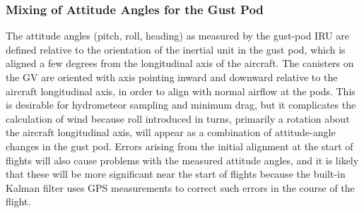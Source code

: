 \documentclass[12pt,twoside,english]{article}\usepackage[]{graphicx}\usepackage[]{color}
\let\OrgIndex\index
\renewcommand*{\index}[1]{\OrgIndex{#1}}
\begin{document}
\subsubsection{Mixing of Attitude Angles for the Gust Pod}



The attitude angles (pitch, roll,  heading) as measured by the gust-pod IRU are defined relative to the orientation of the inertial unit in the gust pod, which is aligned a few degrees from the longitudinal axis of the aircraft. The canisters on the GV are oriented with axis pointing inward and downward relative to the aircraft longitudinal axis, in order to align with normal airflow at the pods. This is desirable for hydrometeor sampling and minimum drag, but it complicates the calculation of wind because roll introduced in turns, primarily a rotation about the aircraft longitudinal axis, will appear as a combination of attitude-angle changes in the gust pod. Errors arising from the initial alignment at the start of flights will also cause problems with the measured attitude angles, and it is likely that these will be more significant near the start of flights because the built-in Kalman filter uses GPS measurements to correct such errors in the course of the flight. 
\end{document}

